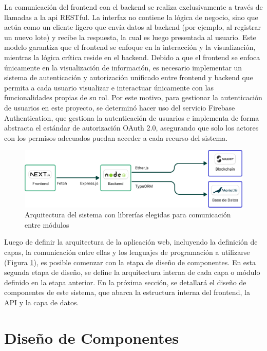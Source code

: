 La comunicación del frontend con el backend se realiza exclusivamente a través de llamadas a la \acrshort{api} RESTful. La interfaz no contiene la lógica de negocio, sino que actúa como un cliente ligero que envía datos al backend (por ejemplo, al registrar un nuevo lote) y recibe la respuesta, la cual es luego presentada al usuario. Este modelo garantiza que el frontend se enfoque en la interacción y la visualización, mientras la lógica crítica reside en el backend. Debido a que el frontend se enfoca únicamente en la visualización de información, es necesario implementar un sistema de autenticación y autorización unificado entre frontend y backend que permita a cada usuario visualizar e interactuar únicamente con las funcionalidades propias de su rol. Por este motivo, para gestionar la autenticación de usuarios en este proyecto, se determinó hacer uso del servicio Firebase Authentication, que gestiona la autenticación de usuarios e implementa de forma abstracta el estándar de autorización OAuth 2.0, asegurando que solo los actores con los permisos adecuados puedan acceder a cada recurso del sistema.

\begin{figure}[!t]
    \centering
    \includegraphics[width=\linewidth]{Figures/system-architecture.png}
    \caption{Arquitectura del sistema con librerías elegidas para comunicación entre módulos}
    \label{fig:system-architecture}
\end{figure}

Luego de definir la arquitectura de la aplicación web, incluyendo la definición de capas, la comunicación entre ellas y los lenguajes de programación a utilizarse (Figura \ref{fig:system-architecture}), es posible comenzar con la etapa de diseño de componentes. En esta segunda etapa de diseño, se define la arquitectura interna de cada capa o módulo definido en la etapa anterior. En la próxima sección, se detallará el diseño de componentes de este sistema, que abarca la estructura interna del frontend, la API y la capa de datos.

\section{Diseño de Componentes}
\label{sec:components-design}

